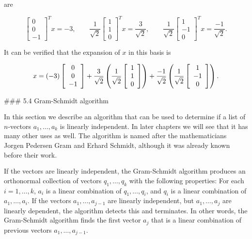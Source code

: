 are

\[\left[\begin{array}{c}0\\ 0\\ -1\end{array}\right]^{T}x=-3,\qquad\frac{1}{\sqrt{2}}\left[\begin{array}{c}1\\ 1\\ 0\end{array}\right]^{T}x=\frac{3}{\sqrt{2}},\qquad\frac{1}{\sqrt{2}}\left[ \begin{array}{c}1\\ -1\\ 0\end{array}\right]^{T}x=\frac{-1}{\sqrt{2}}.\]

It can be verified that the expansion of \(x\) in this basis is

\[x=(-3)\left[\begin{array}{c}0\\ 0\\ -1\end{array}\right]+\frac{3}{\sqrt{2}}\left(\frac{1}{\sqrt{2}}\left[\begin{array} []{c}1\\ 1\\ 0\end{array}\right]\right)+\frac{-1}{\sqrt{2}}\left(\frac{1}{\sqrt{2}}\left[ \begin{array}{c}1\\ -1\\ 0\end{array}\right]\right).\]

### 5.4 Gram-Schmidt algorithm

In this section we describe an algorithm that can be used to determine if a list of \(n\)-vectors \(a_{1},\ldots,a_{k}\) is linearly independent. In later chapters we will see that it has many other uses as well. The algorithm is named after the mathematicians Jorgen Pedersen Gram and Erhard Schmidt, although it was already known before their work.

If the vectors are linearly independent, the Gram-Schmidt algorithm produces an orthonormal collection of vectors \(q_{1},\ldots,q_{k}\) with the following properties: For each \(i=1,\ldots,k\), \(a_{i}\) is a linear combination of \(q_{1},\ldots,q_{i}\), and \(q_{i}\) is a linear combination of \(a_{1},\ldots,a_{i}\). If the vectors \(a_{1},\ldots,a_{j-1}\) are linearly independent, but \(a_{1},\ldots,a_{j}\) are linearly dependent, the algorithm detects this and terminates. In other words, the Gram-Schmidt algorithm finds the first vector \(a_{j}\) that is a linear combination of previous vectors \(a_{1},\ldots,a_{j-1}\).

